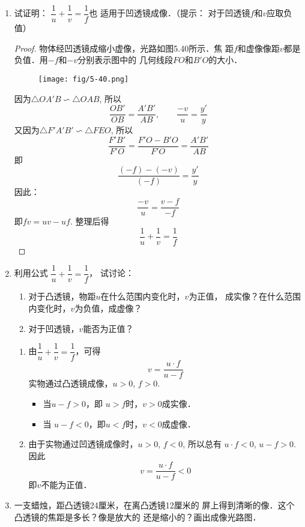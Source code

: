 \begin{enumerate}
    \item 试证明：
$\dfrac{1}{u}+\dfrac{1}{v}=\dfrac{1}{f}$也
适用于凹透镜成像．（提示：
对于凹透镜$f$和$v$应取负值）

\begin{proof}
    物体经凹透镜成缩小虚像，光路如图5.40所示．焦
距$f$和虚像像距$v$都是负值．用$-f$和$-v$分别表示图中的
几何线段$FO$和$B'O$的大小．
    \begin{figure}[htp]
        \centering
        \texttt{[image: fig/5-40.png]}
        \caption{}
    \end{figure}
    
因为$\triangle OA'B\backsim \triangle OAB$, 所以
\[\frac{OB'}{OB}=\frac{A'B'}{AB},\qquad \frac{-v}{u}=\frac{y'}{y}\]
又因为$\triangle F'A'B'\backsim \triangle FEO$, 所以
\[\frac{F'B'}{F'O}=\frac{F'O-B'O}{F'O}=\frac{A'B'}{AB}\]
即\[\frac{(-f)-(-v)}{(-f)}=\frac{y'}{y}\]
因此：
\[\frac{-v}{u}=\frac{v-f}{-f}\]
即$fv=uv-uf$. 整理后得
\[\frac{1}{u}+\frac{1}{v}=\frac{1}{f}\]
\end{proof}
\item  利用公式
$\dfrac{1}{u}+\dfrac{1}{v}=\dfrac{1}{f}$，
试讨论：
\begin{enumerate}
    \item 对于凸透镜，物距$u$在什么范围内变化时，$v$为正值，
    成实像？在什么范围内变化时，$v$为负值，成虚像？
    \item 对于凹透镜，$v$能否为正值？
\end{enumerate}

\begin{solution}
    \begin{enumerate}
        \item 由$\dfrac{1}{u}+\dfrac{1}{v}=\dfrac{1}{f}$，可得
    \[v=\frac{u\cdot f}{u-f}\]
    实物通过凸透镜成像，$u>0$, $f>0$.
    \begin{itemize}
        \item     当$u-f>0$，即 $u>f$时，$v>0$成实像．
        \item  当 $u-f<0$，即$u<f$时，$v<0$成虚像．
    \end{itemize}
\item 由于实物通过凹透镜成像时，$u>0$, $f<0$, 所以总有
    $u\cdot f<0$, $u-f>0$. 因此
    \[v=\frac{u\cdot f}{u-f}<0\]
    即$v$不能为正值．
    \end{enumerate}
\end{solution}
\item 一支蜡烛，距凸透镜24厘米，在离凸透镜12厘米的
屏上得到清晰的像．这个凸透镜的焦距是多长？像是放大的
还是缩小的？画出成像光路图．


\end{enumerate}
